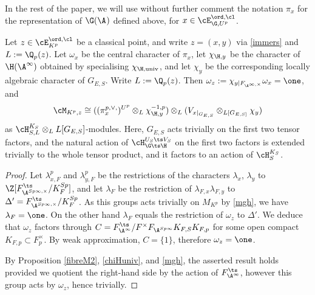 In the rest of the paper, we will use without further comment the notation $\pi_{x}^{}$ for the
 representation of $\G(\A^{})$ defined above, for  $x\in \cE_{\G, U^{p}}^{\ord,\cl }$.


\begin{coro}\label{fibreMad}
Let $z\in \cE_{K^{p}}^{\ord, \cl}$ be a classical point, and write $z=(x,y)$ via \eqref{immers} and $L:=\Q_{p}(z)$. Let $\omega_{x}$ be the central character of $\pi_{x}$, let $\chi_{\H,y}$ be the  character of $\H(\A^{\infty})$ obtained by specialising $\chi_{\H, \rm univ}$, and let $\chi_{y}$ be the corresponding locally algebraic character of $G_{E,S}$. Write $L:=\Q_{p}(z)$. Then $\omega_{z}:=\chi_{y|F_{\A^{\infty, \times}}}\omega_{x} = \one $, and
$$\cM_{K^{p},{z}}\cong
(  (\pi_{x}^{ p,\vee, })^{U^{p}}\otimes_{L}\chi_{\H,y}^{-1,p})  \otimes_{L} (V_{x|_{G_{E,S}}}\otimes_{L[G_{E, S]}} \chi_{y})
$$
as $\cH^{K_{S}}_{S, L}\otimes_{L} L[G_{E,S}]$-modules. Here, $G_{E, S}$ acts trivially on the first two tensor factors, and the natural action of
 $\cH_{\G\ts\H}^{U_{S}\ts V_{S}}$
on the first two factors is extended trivially to the whole tensor product, and  it factors to an action of $\cH^{K_{S}}_{S}$.
\end{coro}

\begin{proof}
Let  $\lambda_{x, F}^{p}$ and $\lambda_{y, F}^{p}$ be the restrictions of the characters $\lambda_{x}$, $\lambda_{y}$ to $\Z[F^{\ts}_{\A^{Sp\infty, \times}}/K_{F}^{Sp}]$, and let $\lambda_{F}$ be the restriction of $\lambda_{F,x}\lambda_{F,y}$ to $\Delta'=F^{\ts}_{\A^{Sp\infty, \times}}/K_{F}^{Sp}$. As this groups acts trivially on $M_{K^{p}}$ by \eqref{mgh}, we have $\lambda_{F}=\one$. On the other hand $\lambda_{F}$ equals the restriction of $\omega_{z}$ to $\Delta'$. We deduce that $\omega_{z}$ factors through $C=F^{\ts}_{\A^{\infty}}/F^{\times}F_{\A^{Sp\infty}}K_{F, S}K_{F,p}$ for some open compact $K_{F,p}\subset F_{p}^{\times}$. By weak approximation, $C=\{1\}$, therefore $\omega_{z}=\one$.

By Proposition \ref{fibreM2}, \eqref{chiHuniv}, and \eqref{mgh}, the asserted result holds provided we quotient the right-hand side by the action of $F_{\A^{\infty}}^{\ts}$,  however  this group acts  by $\omega_{z}$, hence trivially.
\end{proof}



